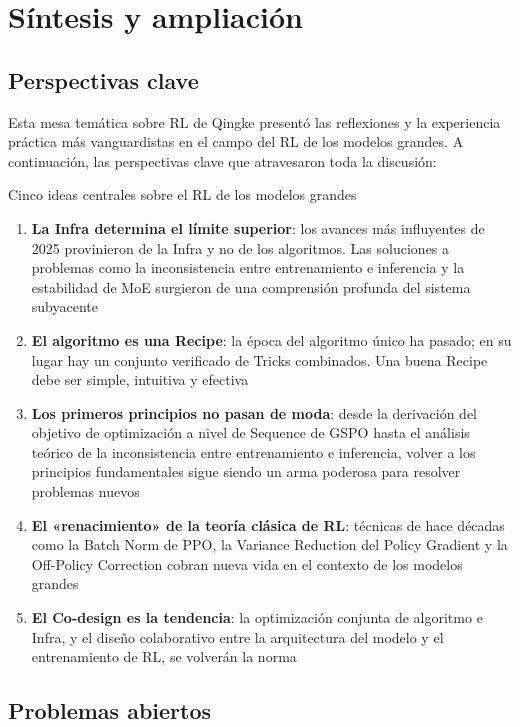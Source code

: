 \section{Síntesis y ampliación}

\subsection{Perspectivas clave}

Esta mesa temática sobre RL de Qingke presentó las reflexiones y la experiencia práctica más vanguardistas en el campo del RL de los modelos grandes. A continuación, las perspectivas clave que atravesaron toda la discusión:

\begin{importantbox}{Cinco ideas centrales sobre el RL de los modelos grandes}
\begin{enumerate}
    \item \textbf{La Infra determina el límite superior}: los avances más influyentes de 2025 provinieron de la Infra y no de los algoritmos. Las soluciones a problemas como la inconsistencia entre entrenamiento e inferencia y la estabilidad de MoE surgieron de una comprensión profunda del sistema subyacente
    \item \textbf{El algoritmo es una Recipe}: la época del algoritmo único ha pasado; en su lugar hay un conjunto verificado de Tricks combinados. Una buena Recipe debe ser simple, intuitiva y efectiva
    \item \textbf{Los primeros principios no pasan de moda}: desde la derivación del objetivo de optimización a nivel de Sequence de GSPO hasta el análisis teórico de la inconsistencia entre entrenamiento e inferencia, volver a los principios fundamentales sigue siendo un arma poderosa para resolver problemas nuevos
    \item \textbf{El «renacimiento» de la teoría clásica de RL}: técnicas de hace décadas como la Batch Norm de PPO, la Variance Reduction del Policy Gradient y la Off-Policy Correction cobran nueva vida en el contexto de los modelos grandes
    \item \textbf{El Co-design es la tendencia}: la optimización conjunta de algoritmo e Infra, y el diseño colaborativo entre la arquitectura del modelo y el entrenamiento de RL, se volverán la norma
\end{enumerate}
\end{importantbox}

\subsection{Problemas abiertos}

